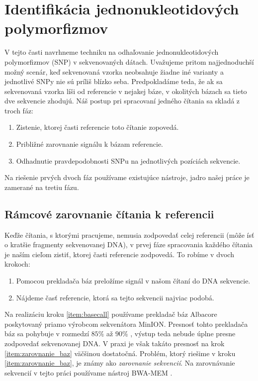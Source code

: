 \chapter{Identifikácia jednonukleotidových polymorfizmov}

\label{kap:identifikacia_SNP} 

V tejto časti navrhneme techniku na odhaľovanie jednonukleotidových
polymorfizmov (SNP) v sekvenovaných dátach. Uvažujeme pritom najjednoduchší
možný scenár, keď sekvenovaná vzorka neobsahuje žiadne iné varianty a jednotlivé
SNPy nie sú príliš blízko seba. Predpokladáme teda, že ak sa sekvenovaná vzorka 
líši od referencie v nejakej báze, v okolitých bázach sa tieto dve sekvencie
zhodujú. Náš postup pri spracovaní jedného čítania sa skladá z troch fáz:

\begin{enumerate}
\item Zistenie, ktorej časti referencie toto čítanie zopovedá.
\item Približné zarovnanie signálu k bázam referencie.
\item Odhadnutie pravdepodobnosti SNPu na jednotlivých pozíciách sekvencie.
\end{enumerate}

Na riešenie prvých dvoch fáz používame existujúce nástroje, jadro našej práce je
zamerané na tretiu fázu.

\section{Rámcové zarovnanie čítania k referencii}
\label{ramcove_zarovnanie}
Keďže čítania, s ktorými pracujeme, nemusia zodpovedať celej referencii (môže ísť o
kratšie fragmenty sekvenovanej DNA), v prvej fáze spracovania každého čítania
je naším cieľom zistiť, ktorej časti referencie zodpovedá. To robíme v dvoch krokoch:

\begin{enumerate}
\item \label{item:basecall} Pomocou prekladača báz preložíme signál v našom čítaní do DNA sekvencie.
\item \label{item:zarovnanie_baz} Nájdeme časť referencie, ktorá sa tejto sekvencii najviac podobá.
\end{enumerate}

Na realizáciu kroku \ref{item:basecall} používame prekladač báz Albacore poskytovaný priamo výrobcom sekvenátora MinION.
Presnosť tohto prekladača báz sa pohybuje v rozmedzí $85\%$ až $90\%$ \cite{BasecallerComparison},
výstup teda nebude úplne presne zodpovedať sekvenovanej
DNA. V praxi je však takáto presnosť na krok \ref{item:zarovnanie_baz} väčšinou dostatočná.
Problém, ktorý riešime v kroku \ref{item:zarovnanie_baz}, je známy ako
\emph{zarovnanie sekvencií}. Na zarovnávanie sekvencií v tejto práci používame
nástroj BWA-MEM \cite{BWA-MEM}.


